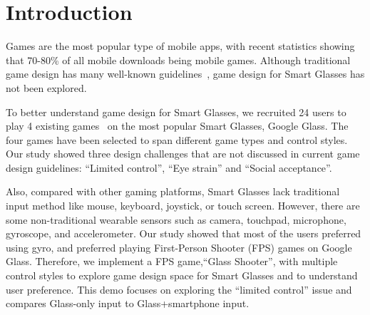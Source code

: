 \documentclass{sigchi}
\begin{document}



\section{Introduction}
Games are the most popular type of mobile apps, with recent statistics showing that 70-80\% of all mobile downloads being mobile games\cite{statistics,infographic}. Although traditional game design has many well-known guidelines~\cite{videogame,mobilegame,bodygame,gameflow,argame,wearable}, game design for Smart Glasses has not been explored.%

To better understand game design for Smart Glasses, we recruited 24 users to play 4 existing games~\cite{minigame} on the most popular Smart Glasses, Google Glass. The four games have been selected to span different game types and control styles. Our study showed three design challenges that are not discussed in current game design guidelines: ``Limited control'', ``Eye strain'' and ``Social acceptance''. 

Also, compared with other gaming platforms, Smart Glasses lack traditional input method like mouse, keyboard, joystick, or touch screen. However, there are some non-traditional wearable sensors such as camera, touchpad, microphone, gyroscope, and accelerometer. Our study showed that most of the users preferred using gyro, and preferred playing First-Person Shooter (FPS) games on Google Glass. Therefore, we implement a FPS game,``Glass Shooter'', with multiple control styles to explore game design space for Smart Glasses and to understand user preference.
This demo focuses on exploring the ``limited control'' issue and compares Glass-only input to Glass+smartphone input. 

\end{document}

